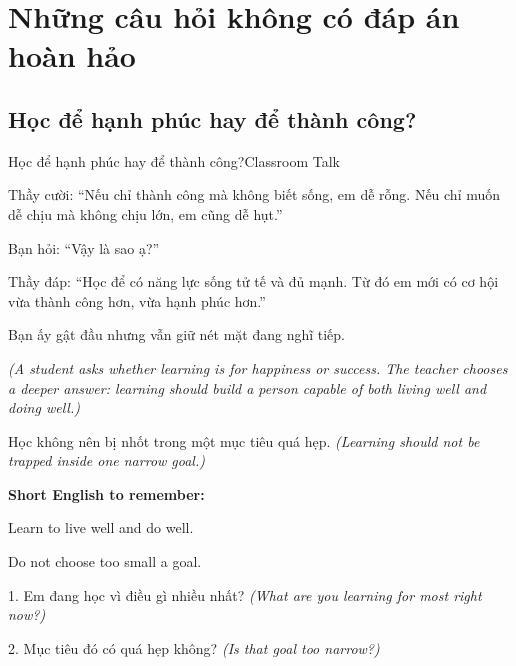 \chapter{Những câu hỏi không có đáp án hoàn hảo}

\section{Học để hạnh phúc hay để thành công?}
\begin{truyen}{Học để hạnh phúc hay để thành công?}{Classroom Talk}

Thầy cười: ``Nếu chỉ thành công mà không biết sống, em dễ rỗng. Nếu chỉ muốn dễ chịu mà không chịu lớn, em cũng dễ hụt.''

Bạn hỏi: ``Vậy là sao ạ?''

Thầy đáp: ``Học để có năng lực sống tử tế và đủ mạnh. Từ đó em mới có cơ hội vừa thành công hơn, vừa hạnh phúc hơn.''

Bạn ấy gật đầu nhưng vẫn giữ nét mặt đang nghĩ tiếp.

\textit{(A student asks whether learning is for happiness or success. The teacher chooses a deeper answer: learning should build a person capable of both living well and doing well.)}
\end{truyen}

\begin{baihoc}
Học không nên bị nhốt trong một mục tiêu quá hẹp.
\textit{(Learning should not be trapped inside one narrow goal.)}
\end{baihoc}

\begin{ghinhoanh}
\textbf{Short English to remember:}

Learn to live well and do well.

Do not choose too small a goal.
\end{ghinhoanh}

\begin{tuhocnhanh}
1. Em đang học vì điều gì nhiều nhất? \textit{(What are you learning for most right now?)}

2. Mục tiêu đó có quá hẹp không? \textit{(Is that goal too narrow?)}
\end{tuhocnhanh}
\ngancach

